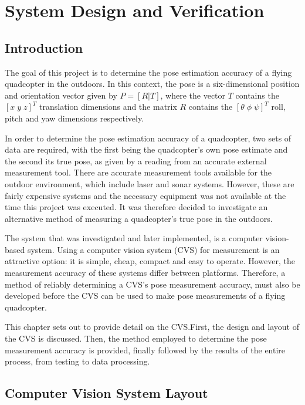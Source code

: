 \chapter{System Design and Verification}
\label{chap3}

\section{Introduction}

The goal of this project is to determine the pose estimation accuracy of a flying quadcopter in the outdoors. In this context, the pose is a six-dimensional position and orientation vector given by $P = [R | T]$, where the vector $T$ contains the $[x\;y\;z]^T$ translation dimensions and the matrix $R$ contains the $[\theta\;\phi\;\psi]^T$ roll, pitch and yaw dimensions respectively. 

In order to determine the pose estimation accuracy of a quadcopter, two sets of data are required, with the first being the quadcopter's own pose estimate and the second its true pose, as given by a reading from an accurate external measurement tool. There are accurate measurement tools available for the outdoor environment, which include laser and sonar systems. However, these are fairly expensive systems and the necessary equipment was not available at the time this project was executed. It was therefore decided to investigate an alternative method of measuring a quadcopter's true pose in the outdoors.

The system that was investigated and later implemented, is a computer vision-based system. Using a computer vision system (CVS) for measurement is an attractive option: it is simple, cheap, compact and easy to operate. However, the measurement accuracy of these systems differ between platforms. Therefore, a method of reliably determining a CVS's pose measurement accuracy, must also be developed before the CVS can be used to make pose measurements of a flying quadcopter. 

This chapter sets out to provide detail on the CVS.\@ First, the design and layout of the CVS is discussed. Then, the method employed to determine the pose measurement accuracy is provided, finally followed by the results of the entire process, from testing to data processing.

\section{Computer Vision System Layout}
\label{sec:chap3-cvs-layout}

